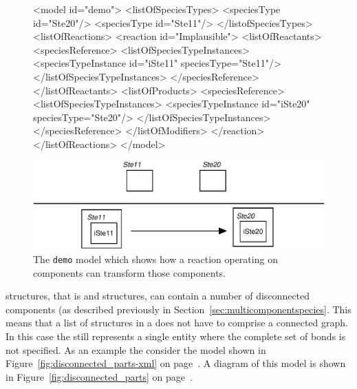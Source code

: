 \documentclass{cekarticle}
\begin{document}
\begin{figure}[h]

\begin{example}
<model id="demo">
    <listOfSpeciesTypes>
        <speciesType id="Ste20"/>
        <speciesType id="Ste11"/>
    </listofSpeciesTypes>
    <listOfReactions>
        <reaction id="Implausible">
            <listOfReactants>
                <speciesReference>
                    <listOfSpeciesTypeInstances>
                        <speciesTypeInstance id="iSte11" speciesType="Ste11"/>
                    </listOfSpeciesTypeInstances>
                </speciesReference>
            </listOfReactants>
            <listOfProducts>
                <speciesReference>
                    <listOfSpeciesTypeInstances>
                        <speciesTypeInstance id="iSte20" speciesType="Ste20"/>
                    </listOfSpeciesTypeInstances>
                </speciesReference>
            </listOfModifiers>
        </reaction>
    </listOfReactions>
</model>
\end{example}
  \vspace*{8pt}
  \centering
  \includegraphics[scale = 0.7]{demo.eps}
  \caption{The \texttt{demo} model which shows how a reaction operating on
  components can transform those components.}
  \label{fig:demo}
\end{figure}

 structures, that is  and 
structures, can contain a number of disconnected components (as described previously in
Section~\ref{sec:multicomponentspecies}.  This means that a list of 
structures in a  does not have to comprise a connected graph.  
In this case the  still represents a single entity where the complete set of
bonds is not specified.  As an example the
consider the model shown in Figure~\ref{fig:disconnected_parts-xml} on
page~\pageref{fig:disconnected_parts-xml}.  A diagram of this model is shown in
Figure~\ref{fig:disconnected_parts} on page~\pageref{fig:disconnected_parts}.
\end{document}
